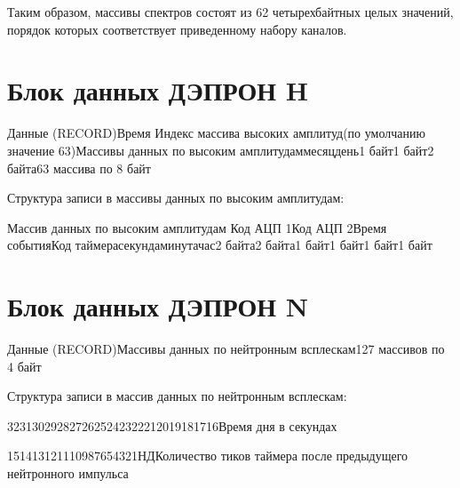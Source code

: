 Таким образом, массивы спектров состоят из 62 четырехбайтных целых значений, порядок которых соответствует приведенному набору каналов.

\section{Блок данных ДЭПРОН H}


{\footnotesize Данные (RECORD)Время Индекс массива высоких амплитуд(по умолчанию значение 63)Массивы данных по высоким амплитудаммесяцдень1 байт1 байт2 байта63 массива  по 8 байт}



Структура записи в массивы данных по высоким амплитудам:



{\footnotesize Массив данных по высоким амплитудам Код АЦП 1Код АЦП 2Время событияКод таймерасекундаминутачас2 байта2 байта1 байт1 байт1 байт1 байт}


\begin{flushleft}
	
\end{flushleft}


\begin{flushleft}
	\newpage
	
\end{flushleft}


\section{Блок данных ДЭПРОН N}

\begin{flushleft}
	
\end{flushleft}


{\footnotesize Данные (RECORD)Массивы данных по нейтронным всплескам127 массивов  по 4 байт}


\begin{flushleft}
	Структура записи в массив данных по нейтронным всплескам:
\end{flushleft}


3231302928272625242322212019181716{\small Время дня в секундах}


\begin{flushleft}
	
\end{flushleft}


151413121110987654321{\small НДКоличество тиков таймера после предыдущего нейтронного импульса}


